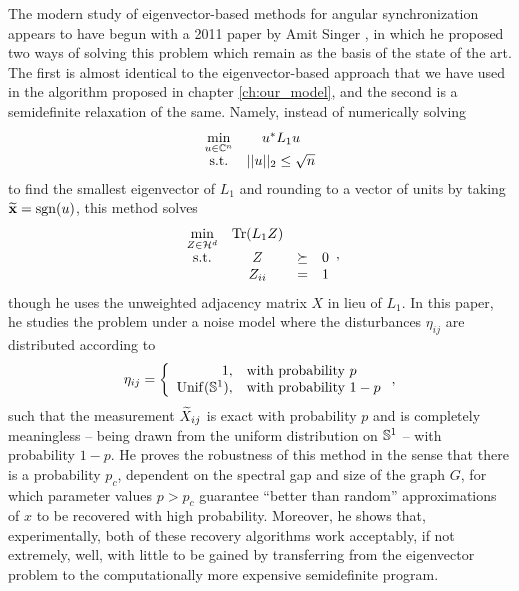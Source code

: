 The modern study of eigenvector-based methods for angular synchronization appears to have begun with a 2011 paper by Amit Singer \cite{singer2011ang_sync}, in which he proposed two ways of solving this problem which remain as the basis of the state of the art.  The first is almost identical to the eigenvector-based approach that we have used in the algorithm proposed in chapter \ref{ch:our_model}, and the second is a semidefinite relaxation of the same.  Namely, instead of numerically solving \[ \begin{array}{cc} \min\limits_{u \in \mathbb{C}^n} & u^* L_1 u \\ \text{s.t.} & ||u||_2 \le \sqrt{n} \end{array} \] to find the smallest eigenvector of $L_1$ and rounding to a vector of units by taking $\widetilde{\mathbf{x}} = \operatorname{sgn}(u)$, this method solves \begin{equation}\begin{array}{cccl} \min\limits_{Z \in \mathcal{H}^d} & \operatorname{Tr}(L_1 Z) \\ \text{s.t.} & Z & \succeq & 0 \\ & Z_{ii} & = & 1 \end{array}, \label{eq:angsyncSDPsinger}\end{equation} though he uses the unweighted adjacency matrix $X$ in lieu of $L_1$.  In this paper, he studies the problem under a noise model where the disturbances $\eta_{ij}$ are distributed according to \[\eta_{ij} = \left\{\begin{array}{r@{,\quad}l} 1 & \text{with probability}\ p \\ \mathrm{Unif}(\Sbb^1) & \text{with probability}\ 1 - p\end{array}\right.,\] such that the measurement $\widetilde{X}_{ij}$ is exact with probability $p$ and is completely meaningless -- being drawn from the uniform distribution on $\mathbb{S}^1$ -- with probability $1 - p$.  He proves the robustness of this method in the sense that there is a probability $p_c$, dependent on the spectral gap and size of the graph $G$, for which parameter values $p > p_c$ guarantee ``better than random'' approximations of $x$ to be recovered with high probability.  Moreover, he shows that, experimentally, both of these recovery algorithms work acceptably, if not extremely, well, with little to be gained by transferring from the eigenvector problem to the computationally more expensive semidefinite program.

